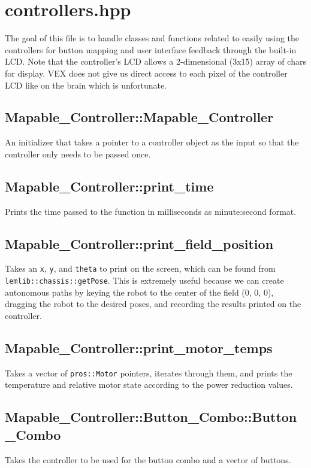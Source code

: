 \section*{controllers.hpp}
The goal of this file is to handle classes and functions related to easily using the controllers for button mapping and user interface feedback through the built-in LCD. Note that the controller's LCD allows a 2-dimensional (3x15) array of chars for display. VEX does not give us direct access to each pixel of the controller LCD like on the brain which is unfortunate.

\subsection*{Mapable\_Controller::Mapable\_Controller}
An initializer that takes a pointer to a controller object as the input so that the controller only needs to be passed once.

\subsection*{Mapable\_Controller::print\_time}
Prints the time passed to the function in milliseconds as minute:second format.

\subsection*{Mapable\_Controller::print\_field\_position}
Takes an \texttt{x}, \texttt{y}, and \texttt{theta} to print on the screen, which can be found from \texttt{lemlib::chassis::getPose}. This is extremely useful because we can create autonomous paths by keying the robot to the center of the field (0, 0, 0), dragging the robot to the desired poses, and recording the results printed on the controller.

\subsection*{Mapable\_Controller::print\_motor\_temps}
Takes a vector of \texttt{pros::Motor} pointers, iterates through them, and prints the temperature and relative motor state according to the power reduction values.

\subsection*{Mapable\_Controller::Button\_Combo::Button\_Combo}
Takes the controller to be used for the button combo and a vector of buttons.

